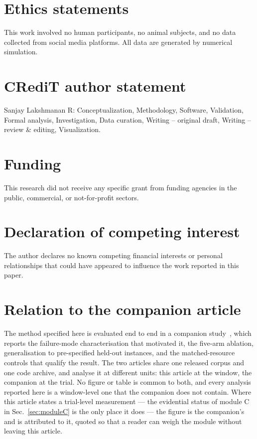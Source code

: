 \documentclass[final,5p,times,longtitle]{elsarticle}
\begin{document}
\section*{Ethics statements}
This work involved no human participants, no animal subjects, and no data
collected from social media platforms. All data are generated by
numerical simulation.

\section*{CRediT author statement}
\noindent
Sanjay Lakshmanan R: Conceptualization, Methodology, Software,
Validation, Formal analysis, Investigation, Data curation,
Writing -- original draft, Writing -- review \& editing, Visualization.

\section*{Funding}
This research did not receive any specific grant from funding agencies in
the public, commercial, or not-for-profit sectors.

\section*{Declaration of competing interest}
The author declares no known competing financial interests or personal
relationships that could have appeared to influence the work reported in
this paper.

\section*{Relation to the companion article}
The method specified here is evaluated end to end in a companion
study~\cite{companion}, which reports the failure-mode characterisation
that motivated it, the five-arm ablation, generalisation to pre-specified
held-out instances, and the matched-resource controls that qualify the
result. The two articles share one released corpus and one code archive,
and analyse it at different units: this article at the window, the
companion at the trial. No figure or table is common to both, and every
analysis reported here is a window-level one that the companion does not
contain. Where this article states a trial-level measurement --- the
evidential status of module C in Sec.~\ref{sec:moduleC} is the only place
it does --- the figure is the companion's and is attributed to it, quoted
so that a reader can weigh the module without leaving this article.
\end{document}

